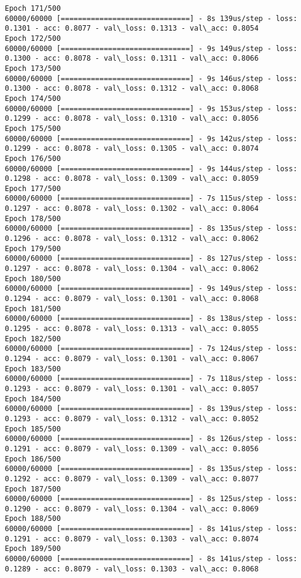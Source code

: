 \documentclass[11pt]{article}
\begin{document}
\begin{Verbatim}[commandchars=\\\{\}]
Epoch 171/500
60000/60000 [==============================] - 8s 139us/step - loss: 0.1301 - acc: 0.8077 - val\_loss: 0.1313 - val\_acc: 0.8054
Epoch 172/500
60000/60000 [==============================] - 9s 149us/step - loss: 0.1300 - acc: 0.8078 - val\_loss: 0.1311 - val\_acc: 0.8066
Epoch 173/500
60000/60000 [==============================] - 9s 146us/step - loss: 0.1300 - acc: 0.8078 - val\_loss: 0.1312 - val\_acc: 0.8068
Epoch 174/500
60000/60000 [==============================] - 9s 153us/step - loss: 0.1299 - acc: 0.8078 - val\_loss: 0.1310 - val\_acc: 0.8056
Epoch 175/500
60000/60000 [==============================] - 9s 142us/step - loss: 0.1299 - acc: 0.8078 - val\_loss: 0.1305 - val\_acc: 0.8074
Epoch 176/500
60000/60000 [==============================] - 9s 144us/step - loss: 0.1298 - acc: 0.8078 - val\_loss: 0.1309 - val\_acc: 0.8059
Epoch 177/500
60000/60000 [==============================] - 7s 115us/step - loss: 0.1297 - acc: 0.8078 - val\_loss: 0.1302 - val\_acc: 0.8064
Epoch 178/500
60000/60000 [==============================] - 8s 135us/step - loss: 0.1296 - acc: 0.8078 - val\_loss: 0.1312 - val\_acc: 0.8062
Epoch 179/500
60000/60000 [==============================] - 8s 127us/step - loss: 0.1297 - acc: 0.8078 - val\_loss: 0.1304 - val\_acc: 0.8062
Epoch 180/500
60000/60000 [==============================] - 9s 149us/step - loss: 0.1294 - acc: 0.8079 - val\_loss: 0.1301 - val\_acc: 0.8068
Epoch 181/500
60000/60000 [==============================] - 8s 138us/step - loss: 0.1295 - acc: 0.8078 - val\_loss: 0.1313 - val\_acc: 0.8055
Epoch 182/500
60000/60000 [==============================] - 7s 124us/step - loss: 0.1294 - acc: 0.8079 - val\_loss: 0.1301 - val\_acc: 0.8067
Epoch 183/500
60000/60000 [==============================] - 7s 118us/step - loss: 0.1293 - acc: 0.8079 - val\_loss: 0.1301 - val\_acc: 0.8057
Epoch 184/500
60000/60000 [==============================] - 8s 139us/step - loss: 0.1293 - acc: 0.8079 - val\_loss: 0.1312 - val\_acc: 0.8052
Epoch 185/500
60000/60000 [==============================] - 8s 126us/step - loss: 0.1291 - acc: 0.8079 - val\_loss: 0.1309 - val\_acc: 0.8056
Epoch 186/500
60000/60000 [==============================] - 8s 135us/step - loss: 0.1292 - acc: 0.8079 - val\_loss: 0.1309 - val\_acc: 0.8077
Epoch 187/500
60000/60000 [==============================] - 8s 125us/step - loss: 0.1290 - acc: 0.8079 - val\_loss: 0.1304 - val\_acc: 0.8069
Epoch 188/500
60000/60000 [==============================] - 8s 141us/step - loss: 0.1291 - acc: 0.8079 - val\_loss: 0.1303 - val\_acc: 0.8074
Epoch 189/500
60000/60000 [==============================] - 8s 141us/step - loss: 0.1289 - acc: 0.8079 - val\_loss: 0.1303 - val\_acc: 0.8068

\end{Verbatim}
\end{document}
